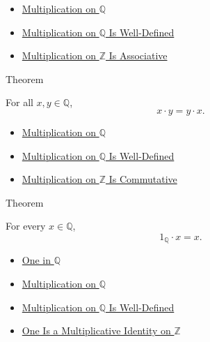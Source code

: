 \begin{dependencies}
\begin{itemize}
  \item \hyperref[def:multiplication-on-q-classes]{Multiplication on $\mathbb{Q}$}
  \item \hyperref[thm:multiplication-on-q-well-defined]{Multiplication on $\mathbb{Q}$ Is Well-Defined}
  \item \hyperref[thm:multiplication-on-z-associative]{Multiplication on $\mathbb{Z}$ Is Associative}
\end{itemize}
\end{dependencies}

\begin{theorembox}{Theorem}
\begin{theorem}
\label{thm:multiplication-on-q-commutative}
For all $x,y\in\mathbb{Q}$,
\[
x\cdot y=y\cdot x.
\]
\end{theorem}
\end{theorembox}

\begin{dependencies}
\begin{itemize}
  \item \hyperref[def:multiplication-on-q-classes]{Multiplication on $\mathbb{Q}$}
  \item \hyperref[thm:multiplication-on-q-well-defined]{Multiplication on $\mathbb{Q}$ Is Well-Defined}
  \item \hyperref[thm:multiplication-on-z-commutative]{Multiplication on $\mathbb{Z}$ Is Commutative}
\end{itemize}
\end{dependencies}

\begin{theorembox}{Theorem}
\begin{theorem}
\label{thm:one-left-multiplicative-identity-on-q}
For every $x\in\mathbb{Q}$,
\[
1_{\mathbb{Q}}\cdot x=x.
\]
\end{theorem}
\end{theorembox}

\begin{dependencies}
\begin{itemize}
  \item \hyperref[def:one-in-q]{One in $\mathbb{Q}$}
  \item \hyperref[def:multiplication-on-q-classes]{Multiplication on $\mathbb{Q}$}
  \item \hyperref[thm:multiplication-on-q-well-defined]{Multiplication on $\mathbb{Q}$ Is Well-Defined}
  \item \hyperref[thm:one-multiplicative-identity-on-z]{One Is a Multiplicative Identity on $\mathbb{Z}$}
\end{itemize}
\end{dependencies}

